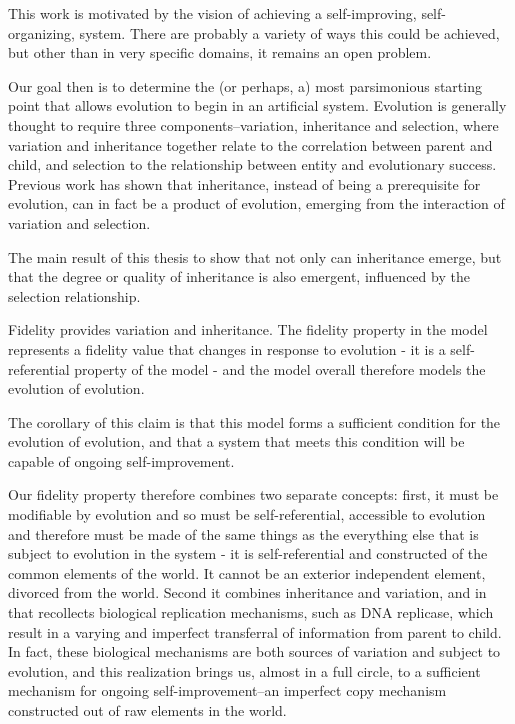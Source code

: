 \documentclass[]{report}
\title{}
\author{}
\begin{document}
This work is motivated by the vision of achieving a self-improving, self-organizing, system. There are probably a variety of ways this could be achieved, but other than in very specific domains, it remains an open problem.

Our goal then is to determine the (or perhaps, a) most parsimonious starting point that allows evolution to begin in an artificial system. Evolution is generally thought to require three components--variation, inheritance and selection, where variation and inheritance together relate to the correlation between parent and child, and selection to the relationship between entity and evolutionary success. Previous work has shown that inheritance, instead of being a prerequisite for evolution, can in fact be a product of evolution, emerging from the interaction of variation and selection.

The main result of this thesis to show that not only can inheritance emerge, but that the degree or quality of inheritance is also emergent, influenced by the selection relationship. 

Fidelity provides variation and inheritance. The fidelity property in the model represents a fidelity value that changes in response to evolution - it is a self-referential property of the model - and the model overall therefore models the evolution of evolution.

The corollary of this claim is that this model forms a sufficient condition for the evolution of evolution, and that a system that meets this condition will be capable of ongoing self-improvement. 

Our fidelity property therefore combines two separate concepts: first, it must be modifiable by evolution and so must be self-referential, accessible to evolution and therefore must be made of the same things as the everything else that is subject to evolution in the system - it is self-referential and constructed of the common elements of the world. It cannot be an exterior independent element, divorced from the world. Second it combines inheritance and variation, and in that recollects biological replication mechanisms, such as DNA replicase, which result in a varying and imperfect transferral of information from parent to child. In fact, these biological mechanisms are both sources of variation and subject to evolution, and this realization brings us, almost in a full circle, to a sufficient mechanism for ongoing self-improvement--an imperfect copy mechanism constructed out of raw elements in the world.
\end{document}
